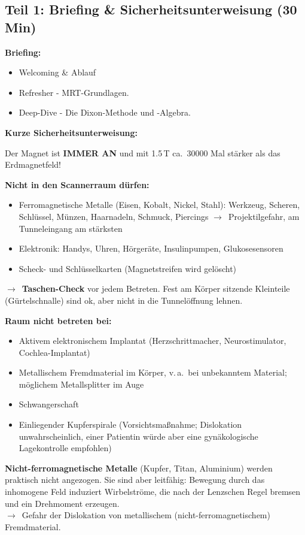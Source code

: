 \documentclass[a4paper,11pt]{article}
\newcommand{\absatzkopf}[1]{\par\vspace{2pt}\textbf{#1}\par\nopagebreak}
\newcommand{\pfeil}{$\rightarrow$}
\begin{document}
\subsection*{Teil 1: Briefing \& Sicherheitsunterweisung (30 Min)}
\absatzkopf{Briefing:}
\begin{itemize}
\item Welcoming \& Ablauf
\item Refresher - MRT-Grundlagen.
\item Deep-Dive - Die Dixon-Methode und -Algebra.
\end{itemize}

\absatzkopf{Kurze Sicherheitsunterweisung:}
\begin{list}{}{\leftmargin=8mm\itemsep=0pt\topsep=0pt}\item
Der Magnet ist \textbf{IMMER AN} und mit 1.5\,T ca.\ 30000 Mal stärker als das Erdmagnetfeld!

\absatzkopf{Nicht in den Scannerraum dürfen:}
\begin{itemize}
\item Ferromagnetische Metalle (Eisen, Kobalt, Nickel, Stahl): Werkzeug, Scheren, Schlüssel, Münzen, Haarnadeln, Schmuck, Piercings \pfeil\ Projektilgefahr, am Tunneleingang am stärksten
\item Elektronik: Handys, Uhren, Hörgeräte, Insulinpumpen, Glukosesensoren
\item Scheck- und Schlüsselkarten (Magnetstreifen wird gelöscht)
\end{itemize}

\pfeil\ \textbf{\glqq Taschen-Check\grqq} vor jedem Betreten. Fest am Körper sitzende Kleinteile (Gürtelschnalle) sind ok, aber nicht in die Tunnelöffnung lehnen.

\absatzkopf{Raum nicht betreten bei:}
\begin{itemize}
\item Aktivem elektronischem Implantat (Herzschrittmacher, Neurostimulator, Cochlea-Implantat)
\item Metallischem Fremdmaterial im Körper, v.\,a.\ bei unbekanntem Material; möglichem Metallsplitter im Auge
\item Schwangerschaft
\item Einliegender Kupferspirale (Vorsichtsmaßnahme; Dislokation unwahrscheinlich, einer Patientin würde aber eine gynäkologische Lagekontrolle empfohlen)
\end{itemize}

\textbf{Nicht-ferromagnetische Metalle} (Kupfer, Titan, Aluminium) werden praktisch nicht angezogen. Sie sind aber leitfähig: Bewegung durch das inhomogene Feld induziert Wirbelströme, die nach der Lenzschen Regel bremsen und ein Drehmoment erzeugen.\\
\pfeil\ Gefahr der Dislokation von metallischem (nicht-ferromagnetischem) Fremdmaterial.


\end{list}
\end{document}
